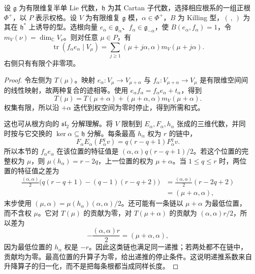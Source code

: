 \begin{lemma}\label{b5:lem:root-trace-recurrence}
	设 \(\mathfrak g\) 为有限维复半单 Lie 代数，\(\mathfrak h\) 为其 Cartan 子代数，选择相应根系的一组正根 \(\Phi^+\)，以 \(P\) 表示权格。设 \(V\) 为有限维复 \(\mathfrak g\) 模，\(\alpha\in\Phi^+\)，\(B\) 为 Killing 型，\((\, ,\,)\) 为其在 \(\mathfrak h^*\) 上诱导的型。选根向量 \(e_\alpha\in\mathfrak g_\alpha\)、\(f_\alpha\in\mathfrak g_{-\alpha}\)，使 \(B(e_\alpha,f_\alpha)=1\)，令 \(m_V(\nu)=\dim_{\mathbb C}V_\nu\)。则对任意 \(\mu\in P\)，有
	\[
		\operatorname{tr}\left(f_\alpha e_\alpha\mid V_\mu\right) =\sum_{j\ge1}(\mu+j\alpha,\alpha)m_V(\mu+j\alpha).
	\]
	右侧只有有限个非零项。
\end{lemma}
\begin{proof}
	令左侧为 \(T(\mu)\)。映射 \(e_\alpha:V_\mu\to V_{\mu+\alpha}\) 与 \(f_\alpha:V_{\mu+\alpha}\to V_\mu\) 是有限维空间间的线性映射，故两种复合的迹相等。使用 \(e_\alpha f_\alpha=f_\alpha e_\alpha+t_\alpha\)，得到
	\[
		T(\mu)=T(\mu+\alpha)+(\mu+\alpha,\alpha)m_V(\mu+\alpha).
	\]
	权集有限，所以沿 \(+\alpha\) 迭代到权空间为零时停止，得到所需和式。

	这也可从根方向的 \(\mathfrak{sl}_2\) 分解理解。将 \(V\) 限制到 \(E_\alpha,F_\alpha,h_\alpha\) 张成的三维代数，并同时按与它交换的 \(\ker\alpha\subseteq\mathfrak h\) 分解。每条最高 \(h_\alpha\) 权为 \(r\) 的链中，
	\[
		F_\alpha E_\alpha(F_\alpha^qv) =q(r-q+1)F_\alpha^qv.
	\]
	所以本节的 \(f_\alpha e_\alpha\) 在该位置的特征值是 \((\alpha,\alpha)q(r-q+1)/2\)。若这个位置的完整权为 \(\mu\)，则 \(\mu(h_\alpha)=r-2q\)，上一位置的权为 \(\mu+\alpha\)。当 \(1\le q\le r\) 时，两位置的特征值之差为
	\[
		\begin{aligned}
			\frac{(\alpha,\alpha)}2 \bigl(q(r-q+1)-(q-1)(r-q+2)\bigr) &=\frac{(\alpha,\alpha)}2(r-2q+2)\\
			&=(\mu+\alpha,\alpha),
		\end{aligned}
	\]
	末步使用 \((\mu,\alpha)=\mu(h_\alpha)(\alpha,\alpha)/2\)。还可能有一条链以 \(\mu+\alpha\) 为最低位置，而不含权 \(\mu\)。它对 \(T(\mu)\) 的贡献为零，对 \(T(\mu+\alpha)\) 的贡献为 \((\alpha,\alpha)r/2\)，所以差为
	\[
		-\frac{(\alpha,\alpha)r}{2}=(\mu+\alpha,\alpha),
	\]
	因为最低位置的 \(h_\alpha\) 权是 \(-r\)。因此这类链也满足同一递推；若两处都不在链中，贡献均为零。最高位置的升算子为零，给出递推的停止条件。这说明递推系数来自升降算子的归一化，而不是把每条根都当成同样长度。
\end{proof}

